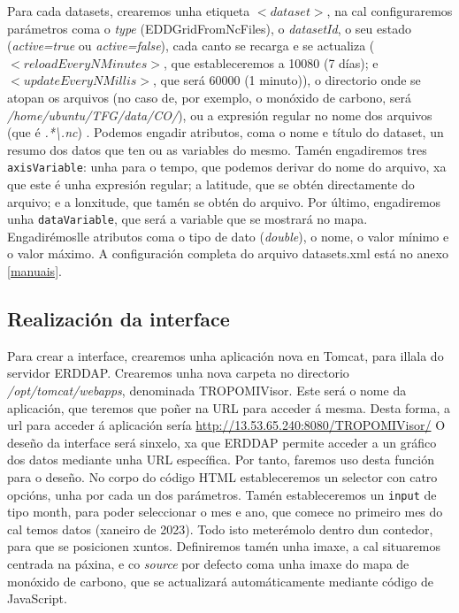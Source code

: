 Para cada datasets, crearemos unha etiqueta $<dataset>$, na cal configuraremos parámetros coma o \textit{type} (EDDGridFromNcFiles), o \textit{datasetId}, o seu estado (\textit{active=true} ou \textit{active=false}),
cada canto se recarga e se actualiza ($<reloadEveryNMinutes>$, que estableceremos a 10080 (7 días); e \break$<updateEveryNMillis>$, que será 60000 (1 minuto)), o directorio onde se atopan os
arquivos (no caso de, por exemplo, o monóxido de carbono, será \textit{/home/ubuntu/TFG/data/CO/}), ou a expresión regular no nome dos arquivos (que é \textit{.*\textbackslash.nc}) . Podemos
engadir atributos, coma o nome e título do dataset, un resumo dos datos que ten ou as variables do mesmo. Tamén engadiremos tres \texttt{axisVariable}: unha para o tempo, que podemos derivar do nome
do arquivo, xa que este é unha expresión regular; a latitude, que se obtén directamente do arquivo; e a lonxitude, que tamén se obtén do arquivo. Por último, engadiremos unha \texttt{dataVariable}, que
será a variable que se mostrará no mapa. Engadirémoslle atributos coma o tipo de dato (\textit{double}), o nome, o valor mínimo e o valor máximo. A configuración completa do arquivo datasets.xml
está no anexo \ref{manuais}.


\subsection{Realización da interface}\label{interface}
Para crear a interface, crearemos unha aplicación nova en Tomcat, para illala do servidor ERDDAP. Crearemos unha nova carpeta no directorio \textit{/opt/tomcat/webapps}, denominada TROPOMIVisor.
Este será o nome da aplicación, que teremos que poñer na URL para acceder á mesma. Desta forma, a url para acceder á aplicación sería \url{http://13.53.65.240:8080/TROPOMIVisor/}
O deseño da interface será sinxelo, xa que ERDDAP permite acceder a un gráfico dos datos mediante unha URL específica. Por tanto, faremos uso desta función para o deseño. No corpo do código HTML
estableceremos un selector con catro opcións, unha por cada un dos parámetros. Tamén estableceremos un \texttt{input} de tipo month, para poder seleccionar o mes e ano, que comece no primeiro mes
do cal temos datos (xaneiro de 2023). Todo isto meterémolo dentro dun contedor, para que se posicionen xuntos. Definiremos tamén unha imaxe, a cal situaremos centrada na páxina, e co \textit{source}
por defecto coma unha imaxe do mapa de monóxido de carbono, que se actualizará automáticamente mediante código de JavaScript.

